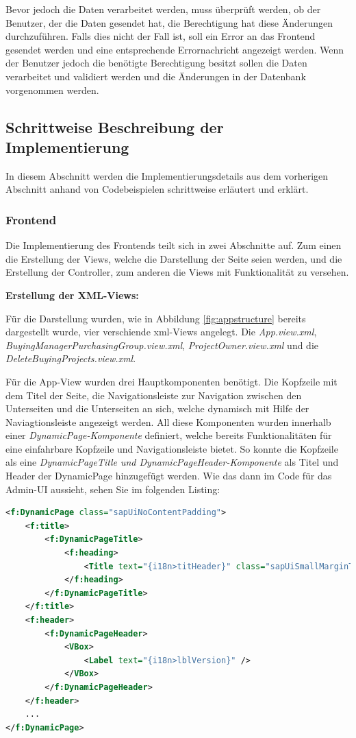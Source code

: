 Bevor jedoch die Daten verarbeitet werden, muss überprüft werden, ob der Benutzer, der die Daten gesendet hat, die Berechtigung hat diese Änderungen durchzuführen.
Falls dies nicht der Fall ist, soll ein Error an das Frontend gesendet werden und eine entsprechende Errornachricht angezeigt werden.
Wenn der Benutzer jedoch die benötigte Berechtigung besitzt sollen die Daten verarbeitet und validiert werden und die Änderungen in der Datenbank vorgenommen werden.

\subsection[Schrittweise Beschreibung der Implementierung]{Schrittweise Beschreibung der Implementierung}

In diesem Abschnitt werden die Implementierungsdetails aus dem vorherigen Abschnitt anhand von Codebeispielen schrittweise erläutert und erklärt.

\subsubsection{Frontend}
Die Implementierung des Frontends teilt sich in zwei Abschnitte auf. 
Zum einen die Erstellung der Views, welche die Darstellung der Seite seien werden, und die Erstellung der Controller, zum anderen die Views mit Funktionalität zu versehen. 

\textbf{Erstellung der XML-Views:}

Für die Darstellung wurden, wie in Abbildung \ref{fig:appstructure} bereits dargestellt wurde, vier verschiende \gls{xml}-Views angelegt.
Die \textit{App.view.xml}, \textit{BuyingManagerPurchasingGroup.view.xml}, \textit{ProjectOwner.view.xml} und die \textit{DeleteBuyingProjects.view.xml}.

Für die App-View wurden drei Hauptkomponenten benötigt.
Die Kopfzeile mit dem Titel der Seite, die Navigationsleiste zur Navigation zwischen den Unterseiten und die Unterseiten an sich, welche dynamisch mit Hilfe der Naviagtionsleiste angezeigt werden.
All diese Komponenten wurden innerhalb einer \textit{DynamicPage-Komponente} definiert, welche bereits Funktionalitäten für eine einfahrbare Kopfzeile und Navigationsleiste bietet.
So konnte die Kopfzeile als eine \textit{DynamicPageTitle und DynamicPageHeader-Komponente} als Titel und Header der DynamicPage hinzugefügt werden.
Wie das dann im Code für das Admin-UI aussieht, sehen Sie im folgenden Listing:

\begin{lstlisting}[caption={Kopfzeile des App-Views}, language={XML}]
<f:DynamicPage class="sapUiNoContentPadding">
    <f:title>
        <f:DynamicPageTitle>
            <f:heading>
                <Title text="{i18n>titHeader}" class="sapUiSmallMarginTop" />
            </f:heading>
        </f:DynamicPageTitle>
    </f:title>
    <f:header>
        <f:DynamicPageHeader>
            <VBox>
                <Label text="{i18n>lblVersion}" />
            </VBox>
        </f:DynamicPageHeader>
    </f:header>
    ...
</f:DynamicPage>
\end{lstlisting}


